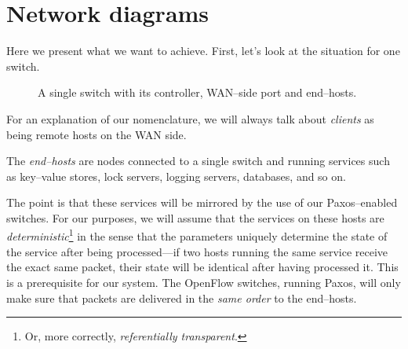 \section{Network diagrams}

Here we present what we want to achieve.  First, let's look at the situation
for one switch.

%
\begin{figure}[H]
  \centering
  \caption{A single switch with its controller, WAN--side port and end--hosts.}
  \label{figure:graph.single.switch}
\end{figure}

For an explanation of our nomenclature, we will always talk about
\textit{clients} as being remote hosts on the \ac{WAN} side.

The \textit{end--hosts} are nodes connected to a single switch and running
services such as key--value stores, lock servers, logging servers,
databases, and so on.

The point is that these services will be mirrored by the use of our
Paxos--enabled switches.  For our purposes, we will assume that the services
on these hosts are \textit{deterministic}\footnote{Or, more correctly,
\textit{referentially transparent}.} in the sense that the parameters
uniquely determine the state of the service after being processed---if two
hosts running the same service receive the exact same packet, their state
will be identical after having processed it.  This is a prerequisite for our
system.  The OpenFlow switches, running Paxos, will only make sure that
packets are delivered in the \textit{same order} to the end--hosts.

